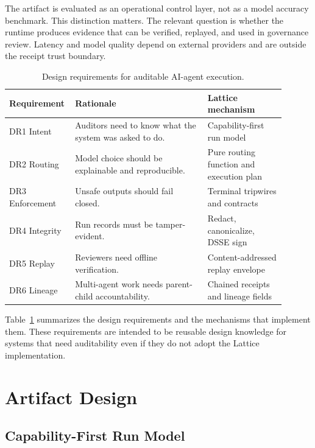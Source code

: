 \documentclass[conference]{IEEEtran}
\begin{document}
The artifact is evaluated as an operational control layer, not as a model
accuracy benchmark. This distinction matters. The relevant question is whether
the runtime produces evidence that can be verified, replayed, and used in
governance review. Latency and model quality depend on external providers and
are outside the receipt trust boundary.

\begin{table}[t]
\centering
\caption{Design requirements for auditable AI-agent execution.}
\label{tab:requirements}
\small
\begin{tabular}{@{}>{\raggedright\arraybackslash}p{0.17\linewidth}>{\raggedright\arraybackslash}p{0.46\linewidth}>{\raggedright\arraybackslash}p{0.27\linewidth}@{}}
\toprule
Requirement & Rationale & Lattice mechanism \\
\midrule
DR1 Intent & Auditors need to know what the system was asked to do. & Capability-first run model \\
DR2 Routing & Model choice should be explainable and reproducible. & Pure routing function and execution plan \\
DR3 Enforcement & Unsafe outputs should fail closed. & Terminal tripwires and contracts \\
DR4 Integrity & Run records must be tamper-evident. & Redact, canonicalize, DSSE sign \\
DR5 Replay & Reviewers need offline verification. & Content-addressed replay envelope \\
DR6 Lineage & Multi-agent work needs parent-child accountability. & Chained receipts and lineage fields \\
\bottomrule
\end{tabular}
\end{table}

Table~\ref{tab:requirements} summarizes the design requirements and the
mechanisms that implement them. These requirements are intended to be reusable
design knowledge for systems that need auditability even if they do not adopt
the Lattice implementation.

\section{Artifact Design}

\subsection{Capability-First Run Model}
\end{document}
